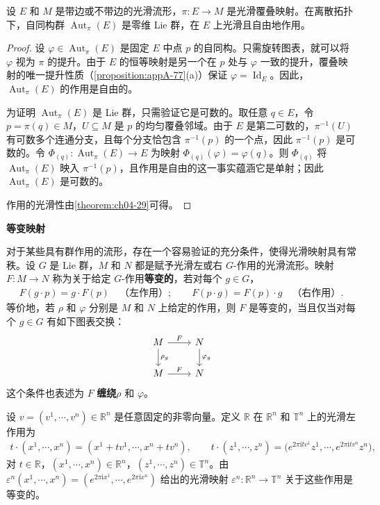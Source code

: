 \documentclass[../../main.tex]{subfiles}
\begin{document}
\begin{proposition}\label{proposition:ch07-23}
设 $E$ 和 $M$ 是带边或不带边的光滑流形，$\pi\colon E\to M$ 是光滑覆叠映射。在离散拓扑下，自同构群 $\operatorname{Aut}_\pi(E)$ 是零维 Lie 群，在 $E$ 上光滑且自由地作用。
\end{proposition}

\begin{proof}
设 $\varphi\in\operatorname{Aut}_\pi(E)$ 是固定 $E$ 中点 $p$ 的自同构。只需旋转图表，就可以将 $\varphi$ 视为 $\pi$ 的提升。由于 $E$ 的恒等映射是另一个在 $p$ 处与 $\varphi$ 一致的提升，覆叠映射的唯一提升性质（\cref{proposition:appA-77}(a)）保证 $\varphi=\operatorname{Id}_E$。因此，$\operatorname{Aut}_\pi(E)$ 的作用是自由的。

为证明 $\operatorname{Aut}_\pi(E)$ 是 Lie 群，只需验证它是可数的。取任意 $q\in E$，令 $p=\pi(q)\in M$，$U\subseteq M$ 是 $p$ 的均匀覆叠邻域。由于 $E$ 是第二可数的，$\pi^{-1}(U)$ 有可数多个连通分支，且每个分支恰包含 $\pi^{-1}(p)$ 的一个点，因此 $\pi^{-1}(p)$ 是可数的。令 $\Phi_{(q)}\colon\operatorname{Aut}_\pi(E)\to E$ 为映射 $\Phi_{(q)}(\varphi)=\varphi(q)$。则 $\Phi_{(q)}$ 将 $\operatorname{Aut}_\pi(E)$ 映入 $\pi^{-1}(p)$，且作用是自由的这一事实蕴涵它是单射；因此 $\operatorname{Aut}_\pi(E)$ 是可数的。

作用的光滑性由\cref{theorem:ch04-29}可得。
\end{proof}

\textbf{等变映射}

对于某些具有群作用的流形，存在一个容易验证的充分条件，使得光滑映射具有常秩。设 $G$ 是 Lie 群，$M$ 和 $N$ 都是赋予光滑左或右 $G$-作用的光滑流形。映射 $F\colon M\to N$ 称为关于给定 $G$-作用\textbf{等变的}，若对每个 $g\in G$，
\begin{align*}
F(g\cdot p)=g\cdot F(p)\quad\text{（左作用）};\qquad F(p\cdot g)=F(p)\cdot g\quad\text{（右作用）}.
\end{align*}
等价地，若 $\rho$ 和 $\varphi$ 分别是 $M$ 和 $N$ 上给定的作用，则 $F$ 是等变的，当且仅当对每个 $g\in G$ 有如下图表交换：
\begin{align*}
\begin{tikzcd}[ampersand replacement=\&]
M \ar{r}{F} \ar{d}{\rho_g} \& N \ar{d}{\varphi_g}\\
M \ar{r}{F} \& N
\end{tikzcd}
\end{align*}
这个条件也表述为 $F$ \textbf{缠绕}$\rho$ 和 $\varphi$。

\begin{example}\label{example:ch07-24}
设 $v=(v^1,\cdots ,v^n)\in\mathbb{R}^n$ 是任意固定的非零向量。定义 $\mathbb{R}$ 在 $\mathbb{R}^n$ 和 $\mathbb{T}^n$ 上的光滑左作用为
\begin{align*}
t\cdot(x^1,\cdots ,x^n)=(x^1+tv^1,\cdots ,x^n+tv^n),\qquad
t\cdot(z^1,\cdots ,z^n)=\bigl(e^{2\pi\mathrm{i}tv^1}z^1,\cdots ,e^{2\pi\mathrm{i}tv^n}z^n\bigr),
\end{align*}
对 $t\in\mathbb{R}$，$(x^1,\cdots ,x^n)\in\mathbb{R}^n$，$(z^1,\cdots ,z^n)\in\mathbb{T}^n$。由 $\varepsilon^n(x^1,\cdots ,x^n)=(e^{2\pi\mathrm{i}x^1},\cdots ,e^{2\pi\mathrm{i}x^n})$ 给出的光滑映射 $\varepsilon^n\colon\mathbb{R}^n\to\mathbb{T}^n$ 关于这些作用是等变的。
\end{example}
\end{document}
